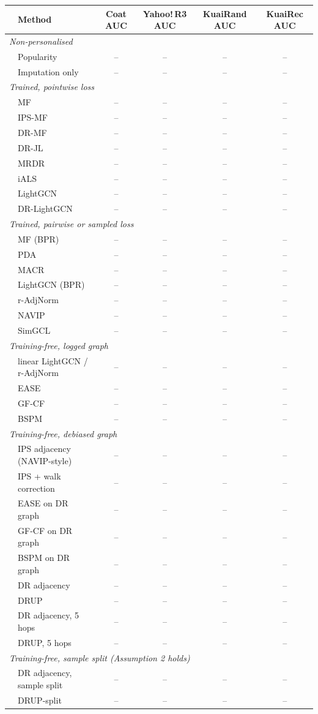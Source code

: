 \begin{tabular}{llcccc}
\toprule
 & Method & Coat AUC & Yahoo!\,R3 AUC & KuaiRand AUC & KuaiRec AUC\\
\midrule
\multicolumn{6}{l}{\emph{Non-personalised}}\\
 & Popularity & -- & -- & -- & --\\
 & Imputation only & -- & -- & -- & --\\
\multicolumn{6}{l}{\emph{Trained, pointwise loss}}\\
 & MF & -- & -- & -- & --\\
 & IPS-MF & -- & -- & -- & --\\
 & DR-MF & -- & -- & -- & --\\
 & DR-JL & -- & -- & -- & --\\
 & MRDR & -- & -- & -- & --\\
 & iALS & -- & -- & -- & --\\
 & LightGCN & -- & -- & -- & --\\
 & DR-LightGCN & -- & -- & -- & --\\
\multicolumn{6}{l}{\emph{Trained, pairwise or sampled loss}}\\
 & MF (BPR) & -- & -- & -- & --\\
 & PDA & -- & -- & -- & --\\
 & MACR & -- & -- & -- & --\\
 & LightGCN (BPR) & -- & -- & -- & --\\
 & r-AdjNorm & -- & -- & -- & --\\
 & NAVIP & -- & -- & -- & --\\
 & SimGCL & -- & -- & -- & --\\
\multicolumn{6}{l}{\emph{Training-free, logged graph}}\\
 & linear LightGCN / r-AdjNorm & -- & -- & -- & --\\
 & EASE & -- & -- & -- & --\\
 & GF-CF & -- & -- & -- & --\\
 & BSPM & -- & -- & -- & --\\
\multicolumn{6}{l}{\emph{Training-free, debiased graph}}\\
 & IPS adjacency (NAVIP-style) & -- & -- & -- & --\\
 & IPS + walk correction & -- & -- & -- & --\\
 & EASE on DR graph & -- & -- & -- & --\\
 & GF-CF on DR graph & -- & -- & -- & --\\
 & BSPM on DR graph & -- & -- & -- & --\\
 & DR adjacency & -- & -- & -- & --\\
 & DRUP & -- & -- & -- & --\\
 & DR adjacency, 5 hops & -- & -- & -- & --\\
 & DRUP, 5 hops & -- & -- & -- & --\\
\multicolumn{6}{l}{\emph{Training-free, sample split (Assumption 2 holds)}}\\
 & DR adjacency, sample split & -- & -- & -- & --\\
 & DRUP-split & -- & -- & -- & --\\
\bottomrule
\end{tabular}
